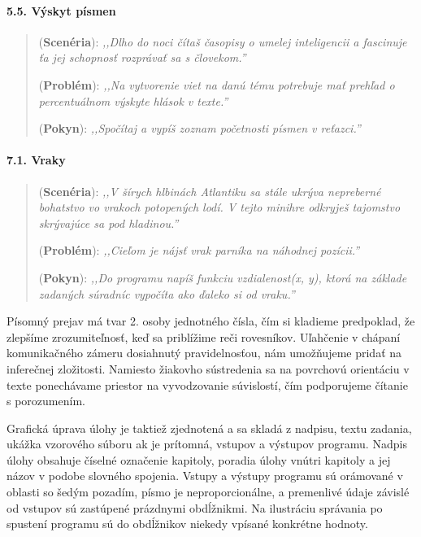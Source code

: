 \paragraph{5.5. Výskyt písmen}
\begin{quote}
(\textbf{Scenéria}): \textit{\small ,,Dlho do noci čítaš časopisy o umelej inteligencii a fascinuje ťa jej schopnosť rozprávať sa s človekom.''}

(\textbf{Problém}): \textit{\small ,,Na vytvorenie viet na danú tému potrebuje mať prehľad o percentuálnom výskyte hlások v texte.''}

(\textbf{Pokyn}): \textit{\small ,,Spočítaj a vypíš zoznam početnosti písmen v reťazci.''}
\end{quote}

\paragraph{7.1. Vraky}
\begin{quote}
(\textbf{Scenéria}): \textit{\small ,,V šírych hlbinách Atlantiku sa stále ukrýva nepreberné bohatstvo vo vrakoch potopených lodí. V tejto minihre odkryješ tajomstvo skrývajúce sa pod hladinou.''}

(\textbf{Problém}): \textit{\small ,,Cieľom je nájsť vrak parníka na náhodnej pozícii.''}

(\textbf{Pokyn}): \textit{\small ,,Do programu napíš funkciu vzdialenost(x, y), ktorá na základe zadaných súradníc vypočíta ako ďaleko si od vraku.''}
\end{quote}

Písomný prejav má tvar 2. osoby jednotného čísla, čím si kladieme predpoklad, že zlepšíme zrozumiteľnosť, keď sa priblížime reči rovesníkov. Uľahčenie v chápaní komunikačného zámeru dosiahnutý pravidelnosťou, nám umožňujeme pridať na inferečnej zložitosti. Namiesto žiakovho sústredenia sa na povrchovú orientáciu v texte ponechávame priestor na vyvodzovanie súvislostí, čím podporujeme čítanie s porozumením.

Grafická úprava úlohy je taktiež zjednotená a sa skladá z nadpisu, textu zadania, ukážka vzorového súboru ak je prítomná, vstupov a výstupov programu. Nadpis úlohy obsahuje číselné označenie kapitoly, poradia úlohy vnútri kapitoly a jej názov v podobe slovného spojenia.
Vstupy a výstupy programu sú orámované v oblasti so šedým pozadím, písmo je neproporcionálne, a premenlivé údaje závislé od vstupov sú zastúpené prázdnymi obdĺžnikmi. Na ilustráciu správania po spustení programu sú do obdĺžnikov niekedy vpísané konkrétne hodnoty.

